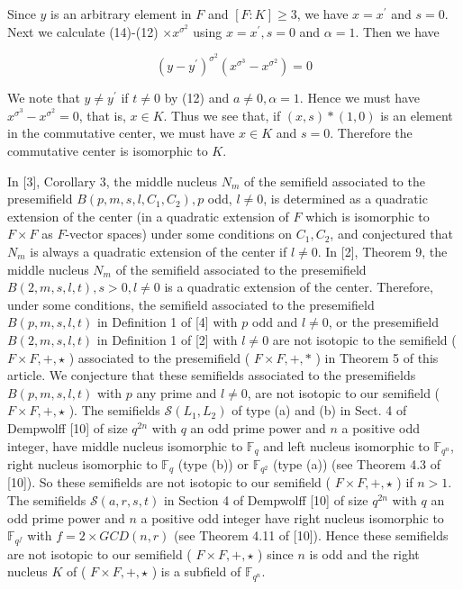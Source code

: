 \documentclass[10pt]{article}
\begin{document}
Since $y$ is an arbitrary element in $F$ and $[F: K] \geq 3$, we have $x=x^{\prime}$ and $s=0$. Next we calculate (14)-(12) $\times x^{\sigma^{2}}$ using $x=x^{\prime}, s=0$ and $\alpha=1$. Then we have

$$
\left(y-y^{\prime}\right)^{\sigma^{2}}\left(x^{\sigma^{3}}-x^{\sigma^{2}}\right)=0
$$

We note that $y \neq y^{\prime}$ if $t \neq 0$ by (12) and $a \neq 0, \alpha=1$. Hence we must have $x^{\sigma^{3}}-x^{\sigma^{2}}=0$, that is, $x \in K$. Thus we see that, if $(x, s) *(1,0)$ is an element in the commutative center, we must have $x \in K$ and $s=0$. Therefore the commutative center is isomorphic to $K$.

In [3], Corollary 3, the middle nucleus $N_{m}$ of the semifield associated to the presemifield $B\left(p, m, s, l, C_{1}, C_{2}\right), p$ odd, $l \neq 0$, is determined as a quadratic extension of the center (in a quadratic extension of $F$ which is isomorphic to $F \times F$ as $F$-vector spaces) under some conditions on $C_{1}, C_{2}$, and conjectured that $N_{m}$ is always a quadratic extension of the center if $l \neq 0$. In [2], Theorem 9, the middle nucleus $N_{m}$ of the semifield associated to the presemifield $B(2, m, s, l, t), s>0, l \neq 0$ is a quadratic extension of the center. Therefore, under some conditions, the semifield associated to the presemifield $B(p, m, s, l, t)$ in Definition 1 of [4] with $p$ odd and $l \neq 0$, or the presemifield $B(2, m, s, l, t)$ in Definition 1 of [2] with $l \neq 0$ are not isotopic to the semifield ( $F \times F,+, \star$ ) associated to the presemifield ( $F \times F,+, *$ ) in Theorem 5 of this article. We conjecture that these semifields associated to the presemifields $B(p, m, s, l, t)$ with $p$ any prime and $l \neq 0$, are not isotopic to our semifield ( $F \times F,+, \star$ ). The semifields $\mathcal{S}\left(L_{1}, L_{2}\right)$ of type (a) and (b) in Sect. 4 of Dempwolff [10] of size $q^{2 n}$ with $q$ an odd prime power and $n$ a positive odd integer, have middle nucleus isomorphic to $\mathbb{F}_{q}$ and left nucleus isomorphic to $\mathbb{F}_{q^{n}}$, right nucleus isomorphic to $\mathbb{F}_{q}$ (type (b)) or $\mathbb{F}_{q^{2}}$ (type (a)) (see Theorem 4.3 of [10]). So these semifields are not isotopic to our semifield ( $F \times F,+, \star$ ) if $n>1$. The semifields $\mathcal{S}(a, r, s, t)$ in Section 4 of Dempwolff [10] of size $q^{2 n}$ with $q$ an odd prime power and $n$ a positive odd integer have right nucleus isomorphic to $\mathbb{F}_{q^{f}}$ with $f=2 \times G C D(n, r)$ (see Theorem 4.11 of [10]). Hence these semifields are not isotopic to our semifield ( $F \times F,+, \star$ ) since $n$ is odd and the right nucleus $K$ of ( $F \times F,+, \star$ ) is a subfield of $\mathbb{F}_{q^{n}}$.
\end{document}
